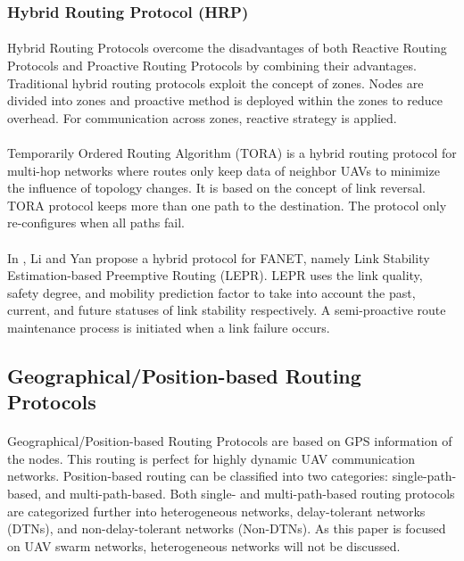 \documentclass[a4paper,12pt]{report}
\begin{document}
\subsubsection{Hybrid Routing Protocol (HRP)}
\paragraph{}
Hybrid Routing Protocols overcome the disadvantages of both Reactive Routing Protocols and Proactive Routing Protocols by combining their advantages\cite{topobased}. Traditional hybrid routing protocols exploit the concept of zones\cite{haas2001zone, wang2004two}. Nodes are divided into zones and proactive method is deployed within the zones to reduce overhead. For communication across zones, reactive strategy is applied. 

\paragraph{}
Temporarily Ordered Routing Algorithm (TORA) is a hybrid routing protocol for multi-hop networks where routes only keep data of neighbor UAVs to minimize the influence of topology changes\cite{8772093}. It is based on the concept of link reversal\cite{gupta2010performance}. TORA protocol keeps more than one path to the destination. The protocol only re-configures when all paths fail.

\paragraph{}
In \cite{li2017lepr}, Li and Yan propose a hybrid protocol for FANET, namely Link Stability Estimation-based Preemptive Routing (LEPR). LEPR uses the link quality, safety degree, and mobility prediction factor to take into account the past, current, and future statuses of link stability respectively. A semi-proactive route maintenance process is initiated when a link failure occurs.

\subsection{Geographical/Position-based Routing Protocols}
\paragraph{}
Geographical/Position-based Routing Protocols are based on GPS information of the nodes. This routing is perfect for highly dynamic UAV communication networks. Position-based routing can be classified into two categories: single-path-based, and multi-path-based. Both single- and multi-path-based routing protocols are categorized further into heterogeneous networks, delay-tolerant networks (DTNs), and non-delay-tolerant networks (Non-DTNs)\cite{8772093}. As this paper is focused on UAV swarm networks, heterogeneous networks will not be discussed. 
\end{document}
